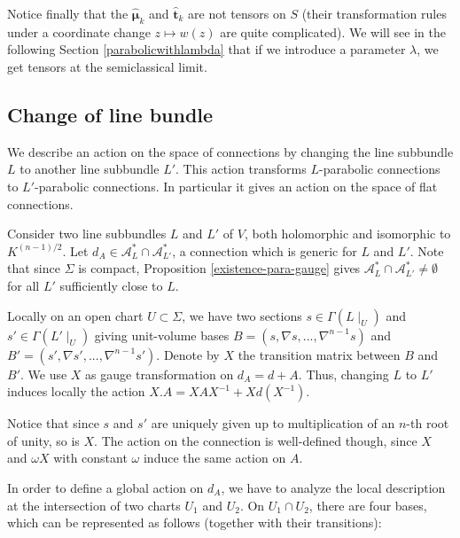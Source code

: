 \documentclass[11pt]{amsart}
\numberwithin{thm}{section} %
\numberwithin{equation}{section} %
\numberwithin{figure}{section} %
\renewcommand*{\S}{S}
\renewcommand*{\l}{\lambda}
\begin{document}
Notice finally that the $\bm\hat{\mu}_k$ and $\bm\hat{t}_k$ are not tensors on $\S$ (their transformation rules under a coordinate change $z\mapsto w(z)$ are quite complicated). 
We will see in the following Section \ref{parabolicwithlambda} that if we introduce a parameter $\l$, we get tensors at the semiclassical limit.


\subsection{Change of line bundle}\label{symponconnections}

We describe an action on the space of connections by changing the line subbundle $L$ to another line subbundle $L'$. This action transforms $L$-parabolic connections to $L'$-parabolic connections. In particular it gives an action on the space of flat connections. 

\medskip
Consider two line subbundles $L$ and $L'$ of $V$, both holomorphic and isomorphic to $K^{(n-1)/2}$. Let $d_A\in \mathcal{A}^*_L\cap \mathcal{A}^*_{L'}$, a connection which is generic for $L$ and $L'$. Note that since $\Sigma$ is compact, Proposition \ref{existence-para-gauge} gives $\mathcal{A}^*_L\cap\mathcal{A}^*_{L'}\neq \emptyset$ for all $L'$ sufficiently close to $L$.

Locally on an open chart $U\subset \Sigma$, we have two sections $s\in\Gamma(L\!\mid_U)$ and $s'\in\Gamma(L'\!\mid_U)$ giving unit-volume bases $B=(s,\nabla s,...,\nabla^{n-1}s)$ and $B'=(s',\nabla s',...,\nabla^{n-1}s')$. Denote by $X$ the transition matrix between $B$ and $B'$. 
We use $X$ as gauge transformation on $d_A=d+A$. Thus, changing $L$ to $L'$ induces locally the action $X.A = XAX^{-1}+Xd\left(X^{-1}\right)$.

Notice that since $s$ and $s'$ are uniquely given up to multiplication of an $n$-th root of unity, so is $X$. The action on the connection is well-defined though, since $X$ and $\omega X$ with constant $\omega$ induce the same action on $A$.

In order to define a global action on $d_A$, we have to analyze the local description at the intersection of two charts $U_1$ and $U_2$. On $U_1\cap U_2$, there are four bases, which can be represented as follows (together with their transitions):

\vspace{0.2cm}
\begin{center}
\end{center}
\vspace{0.2cm}
\end{document}
